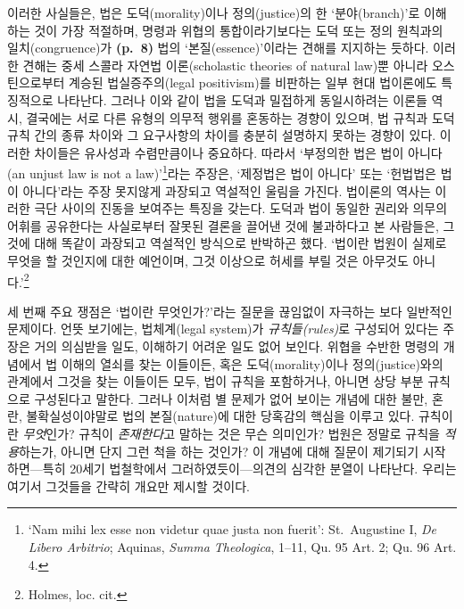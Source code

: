 \documentclass[12pt, oneside]{book}  %
\begin{document}
이러한 사실들은, 법은 도덕(morality)이나 정의(justice)의 한
`분야(branch)'로 이해하는 것이 가장 적절하며, 명령과 위협의
통합이라기보다는 도덕 또는 정의 원칙과의 일치(congruence)가
\textbf{(p.~8)} 법의 `본질(essence)'이라는 견해를 지지하는 듯하다.
이러한 견해는 중세 스콜라 자연법 이론(scholastic theories of natural
law)뿐 아니라 오스틴으로부터 계승된 법실증주의(legal positivism)를
비판하는 일부 현대 법이론에도 특징적으로 나타난다. 그러나 이와 같이 법을
도덕과 밀접하게 동일시하려는 이론들 역시, 결국에는 서로 다른 유형의
의무적 행위를 혼동하는 경향이 있으며, 법 규칙과 도덕 규칙 간의 종류
차이와 그 요구사항의 차이를 충분히 설명하지 못하는 경향이 있다. 이러한
차이들은 유사성과 수렴만큼이나 중요하다. 따라서 `부정의한 법은 법이
아니다(an unjust law is not a law)'\footnote{`Nam mihi lex esse non
  videtur quae justa non fuerit': St.~Augustine I, \emph{De Libero
  Arbitrio}; Aquinas, \emph{Summa Theologica}, 1--11, Qu. 95 Art. 2; Qu.
  96 Art. 4.}라는 주장은, `제정법은 법이 아니다' 또는 `헌법법은 법이
아니다'라는 주장 못지않게 과장되고 역설적인 울림을 가진다. 법이론의
역사는 이러한 극단 사이의 진동을 보여주는 특징을 갖는다. 도덕과 법이
동일한 권리와 의무의 어휘를 공유한다는 사실로부터 잘못된 결론을 끌어낸
것에 불과하다고 본 사람들은, 그것에 대해 똑같이 과장되고 역설적인
방식으로 반박하곤 했다. `법이란 법원이 실제로 무엇을 할 것인지에 대한
예언이며, 그것 이상으로 허세를 부릴 것은 아무것도 아니다.'\footnote{Holmes,
  loc. cit.}

세 번째 주요 쟁점은 `법이란 무엇인가?'라는 질문을 끊임없이 자극하는 보다
일반적인 문제이다. 언뜻 보기에는, 법체계(legal system)가
\emph{규칙들(rules)}로 구성되어 있다는 주장은 거의 의심받을 일도,
이해하기 어려운 일도 없어 보인다. 위협을 수반한 명령의 개념에서 법
이해의 열쇠를 찾는 이들이든, 혹은 도덕(morality)이나 정의(justice)와의
관계에서 그것을 찾는 이들이든 모두, 법이 규칙을 포함하거나, 아니면 상당
부분 규칙으로 구성된다고 말한다. 그러나 이처럼 별 문제가 없어 보이는
개념에 대한 불만, 혼란, 불확실성이야말로 법의 본질(nature)에 대한
당혹감의 핵심을 이루고 있다. 규칙이란 \emph{무엇}인가? 규칙이
\emph{존재한다}고 말하는 것은 무슨 의미인가? 법원은 정말로 규칙을
\emph{적용}하는가, 아니면 단지 그런 척을 하는 것인가? 이 개념에 대해
질문이 제기되기 시작하면---특히 20세기 법철학에서 그러하였듯이---의견의
심각한 분열이 나타난다. 우리는 여기서 그것들을 간략히 개요만 제시할
것이다.
\end{document}
